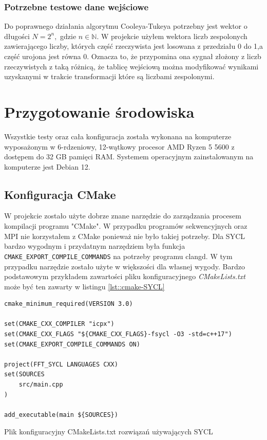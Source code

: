 \documentclass[a4paper,12pt]{book} %
\begin{document}
\subsubsection{Potrzebne testowe dane wejściowe}
Do poprawnego działania algorytmu Cooleya-Tukeya potrzebny jest wektor o długości $N = 2^n,$ gdzie $n \in \mathbb{N}$. W projekcie użyłem wektora liczb zespolonych zawierającego liczby, których część rzeczywista jest losowana z przedziału 0 do 1,a część urojona jest równa 0. Oznacza to, że przypomina ona sygnał złożony z liczb rzeczywistych z taką różnicą, że tablicę wejściową można modyfikować wynikami uzyskanymi w trakcie transformacji które są liczbami zespolonymi.
\section{Przygotowanie środowiska}
Wszystkie testy oraz cała konfiguracja została wykonana na komputerze wyposażonym w 6-rdzeniowy, 12-wątkowy procesor AMD Ryzen 5 5600 z dostępem do 32 GB pamięci RAM.
Systemem operacyjnym zainstalowanym na komputerze jest Debian 12.
\subsection{Konfiguracja CMake}
W projekcie zostało użyte dobrze znane narzędzie do zarządzania procesem kompilacji programu "CMake". W przypadku programów sekwencyjnych oraz MPI nie korzystałem z CMake ponieważ nie było takiej potrzeby.
Dla SYCL bardzo wygodnym i przydatnym narzędziem była funkcja \texttt{CMAKE\_EXPORT\_COMPILE\_COMMANDS} na potrzeby programu clangd. W tym przypadku narzędzie zostało użyte w większości dla własnej wygody. Bardzo podstawowym przykładem zawartości pliku konfiguracyjnego \emph{CMakeLists.txt} może być ten zawarty w listingu \ref{lst::cmake-SYCL}

\begin{lstfloat}[H]
\begin{lstlisting}[frame=single]
cmake_minimum_required(VERSION 3.0)

set(CMAKE_CXX_COMPILER "icpx")
set(CMAKE_CXX_FLAGS "${CMAKE_CXX_FLAGS}-fsycl -O3 -std=c++17")
set(CMAKE_EXPORT_COMPILE_COMMANDS ON)

project(FFT_SYCL LANGUAGES CXX)
set(SOURCES 
    src/main.cpp
)

add_executable(main ${SOURCES})
\end{lstlisting}
\caption{Plik konfiguracyjny CMakeLists.txt rozwiązań używających SYCL}
\label{lst::cmake-SYCL}
\end{lstfloat}
\end{document}
